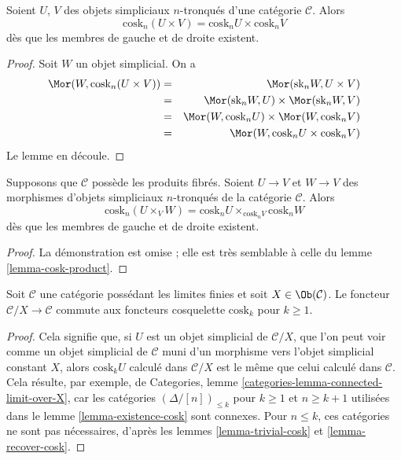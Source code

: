 \begin{lemma}
\label{lemma-cosk-product}
Soient $U$, $V$ des objets simpliciaux $n$-tronqués d'une catégorie
$\mathcal{C}$. Alors
$$
\text{cosk}_n (U \times V) = \text{cosk}_nU \times \text{cosk}_nV
$$
dès que les membres de gauche et de droite existent.
\end{lemma}

\begin{proof}
Soit $W$ un objet simplicial. On a
\begin{eqnarray*}
\Mor(W, \text{cosk}_n (U \times V))
& = &
\Mor(\text{sk}_n W, U \times V) \\
& = &
\Mor(\text{sk}_n W, U)
\times
\Mor(\text{sk}_nW, V) \\
& = &
\Mor(W, \text{cosk}_n U)
\times
\Mor(W, \text{cosk}_n V) \\
& = &
\Mor(W, \text{cosk}_n U \times \text{cosk}_n V)
\end{eqnarray*}
Le lemme en découle.
\end{proof}

\begin{lemma}
\label{lemma-cosk-fibre-product}
Supposons que $\mathcal{C}$ possède les produits fibrés. Soient
$U \to V$ et $W \to V$ des morphismes d'objets simpliciaux $n$-tronqués
de la catégorie $\mathcal{C}$. Alors
$$
\text{cosk}_n (U \times_V W)
=
\text{cosk}_nU \times_{\text{cosk}_n V} \text{cosk}_nW
$$
dès que les membres de gauche et de droite existent.
\end{lemma}

\begin{proof}
La démonstration est omise ; elle est très semblable à celle du lemme
\ref{lemma-cosk-product}.
\end{proof}

\begin{lemma}
\label{lemma-cosk-above-object}
Soit $\mathcal{C}$ une catégorie possédant les limites finies et soit
$X \in \Ob(\mathcal{C})$. Le foncteur $\mathcal{C}/X \to \mathcal{C}$
commute aux foncteurs cosquelette $\text{cosk}_k$ pour $k \geq 1$.
\end{lemma}

\begin{proof}
Cela signifie que, si $U$ est un objet simplicial de $\mathcal{C}/X$,
que l'on peut voir comme un objet simplicial de $\mathcal{C}$ muni d'un
morphisme vers l'objet simplicial constant $X$, alors
$\text{cosk}_k U$ calculé dans $\mathcal{C}/X$ est le même que celui
calculé dans $\mathcal{C}$. Cela résulte, par exemple, de Categories,
lemme \ref{categories-lemma-connected-limit-over-X}, car les catégories
$(\Delta/[n])_{\leq k}$ pour $k \geq 1$ et $n \geq k + 1$ utilisées dans
le lemme \ref{lemma-existence-cosk} sont connexes. Pour $n \leq k$, ces
catégories ne sont pas nécessaires, d'après les lemmes
\ref{lemma-trivial-cosk} et \ref{lemma-recover-cosk}.
\end{proof}


